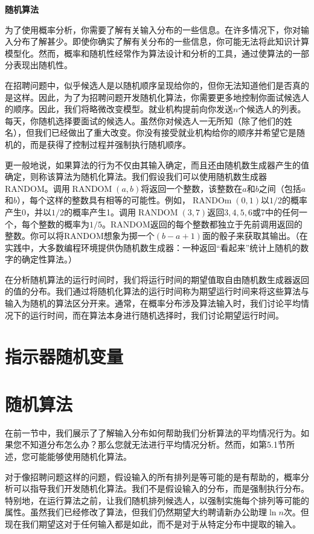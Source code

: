\documentclass[lang=cn,newtx,10pt,scheme=chinese]{elegantbook}
\begin{document}
\textbf{随机算法}

为了使用概率分析，你需要了解有关输入分布的一些信息。在许多情况下，你对输入分布了解甚少。即使你确实了解有关分布的一些信息，你可能无法将此知识计算模型化。然而，概率和随机性经常作为算法设计和分析的工具，通过使算法的一部分表现出随机性。

在招聘问题中，似乎候选人是以随机顺序呈现给你的，但你无法知道他们是否真的是这样。因此，为了为招聘问题开发随机化算法，你需要更多地控制你面试候选人的顺序。因此，我们将略微改变模型。就业机构提前向你发送$n$个候选人的列表。每天，你随机选择要面试的候选人。虽然你对候选人一无所知（除了他们的姓名），但我们已经做出了重大改变。你没有接受就业机构给你的顺序并希望它是随机的，而是获得了控制过程并强制执行随机顺序。

更一般地说，如果算法的行为不仅由其输入确定，而且还由随机数生成器产生的值确定，则称该算法为随机化算法。我们假设我们可以使用随机数生成器RANDOM。调用$\operatorname{RANDOM}(a,b)$将返回一个整数，该整数在$a$和$b$之间（包括$a$和$b$），每个这样的整数具有相等的可能性。例如，$\operatorname{RANDOm}(0,1)$以$1/2$的概率产生0，并以$1/2$的概率产生1。调用$\operatorname{RANDOM}(3,7)$返回$3,4,5,6$或7中的任何一个，每个整数的概率为$1/5$。RANDOM返回的每个整数都独立于先前调用返回的整数。你可以将RANDOM想象为掷一个$(b-a+1)$面的骰子来获取其输出。（在实践中，大多数编程环境提供伪随机数生成器：一种返回“看起来”统计上随机的数字的确定性算法。）

在分析随机算法的运行时间时，我们将运行时间的期望值取自由随机数生成器返回的值的分布。我们通过将随机化算法的运行时间称为期望运行时间来将这些算法与输入为随机的算法区分开来。通常，在概率分布涉及算法输入时，我们讨论平均情况下的运行时间，而在算法本身进行随机选择时，我们讨论期望运行时间。

\section{指示器随机变量}

\section{随机算法}

在前一节中，我们展示了了解输入分布如何帮助我们分析算法的平均情况行为。如果您不知道分布怎么办？那么您就无法进行平均情况分析。然而，如第5.1节所述，您可能能够使用随机化算法。

对于像招聘问题这样的问题，假设输入的所有排列是等可能的是有帮助的，概率分析可以指导我们开发随机化算法。我们不是假设输入的分布，而是强制执行分布。特别地，在运行算法之前，让我们随机排列候选人，以强制实施每个排列等可能的属性。虽然我们已经修改了算法，但我们仍然期望大约聘请新办公助理$\ln n$次。但现在我们期望这对于任何输入都是如此，而不是对于从特定分布中提取的输入。
\end{document}
